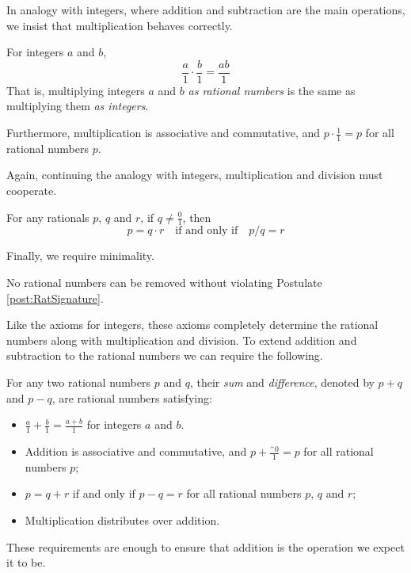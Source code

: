 In analogy with integers, where addition and subtraction are the main operations, we insist that
multiplication behaves correctly. 

\begin{postulate}\label{post:RatMultiplication}
For integers $a$ and $b$,
\[\frac{a}1 \cdot \frac{b}1 = \frac{ab}1\]
That is, multiplying integers $a$ and $b$ \emph{as rational numbers} is the same as multiplying them \emph{as integers}.

Furthermore, multiplication is associative and commutative, and $p \cdot \frac{1}{1} = p$ for all rational numbers $p$.
\end{postulate}

Again, continuing the analogy with integers, multiplication and division must cooperate.
\begin{postulate}\label{post:rationaldivision}
For any rationals $p$, $q$ and $r$,
if $q\neq \frac{0}1$, then 
\[p= q \cdot r\quad\text{if and only if}\quad p/q = r\]
\end{postulate}

Finally, we require minimality.

\begin{postulate}\label{post:RationalInduction}
  No rational numbers can be removed without violating Postulate \ref{post:RatSignature}.
\end{postulate}

Like the axioms for integers, these axioms completely determine the rational numbers along with multiplication and division. 
To extend addition and subtraction to the rational numbers we can require the following.

\begin{defn}
For any two rational numbers $p$ and $q$, their \emph{sum} and \emph{difference}, denoted by $p+q$ and $p-q$, are rational numbers
satisfying:
\begin{itemize}
\item  $\frac{a}{1} + \frac{b}{1} = \frac{a+b}{1}$ for integers $a$ and $b$. 
\item Addition is associative and commutative, and $p + \frac{{}^+0}1 = p$ for all rational numbers $p$;
\item $p = q + r$ if and only if $p - q = r$ for all rational numbers $p$, $q$ and $r$;
\item Multiplication distributes over addition.
\end{itemize}
\end{defn}

These requirements are enough to ensure that addition is the operation we expect
it to be. 

